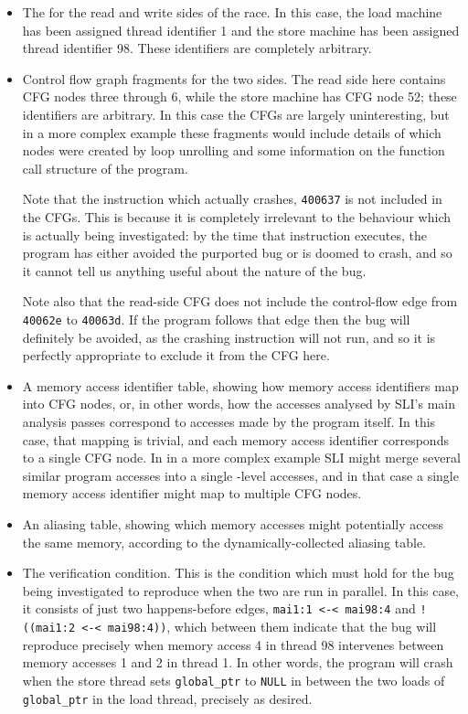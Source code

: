 \begin{itemize}
\item The {\StateMachines} for the read and write sides of the race.
  In this case, the load machine has been assigned thread identifier 1
  and the store machine has been assigned thread identifier 98.  These
  identifiers are completely arbitrary.
\item Control flow graph fragments for the two sides.  The read side
  here contains CFG nodes three through 6, while the store machine has
  CFG node 52; these identifiers are arbitrary.  In this case the CFGs
  are largely uninteresting, but in a more complex example these
  fragments would include details of which nodes were created by
  loop unrolling and some information on the function call structure
  of the program.

  Note that the instruction which actually crashes, \verb|400637| is
  not included in the CFGs.  This is because it is completely
  irrelevant to the behaviour which is actually being investigated: by
  the time that instruction executes, the program has either avoided
  the purported bug or is doomed to crash, and so it cannot tell us
  anything useful about the nature of the bug.

  Note also that the read-side CFG does not include the control-flow
  edge from \verb|40062e| to \verb|40063d|.  If the program follows
  that edge then the bug will definitely be avoided, as the crashing
  instruction will not run, and so it is perfectly appropriate to
  exclude it from the CFG here.
\item A memory access identifier table, showing how memory access
  identifiers map into CFG nodes, or, in other words, how the accesses
  analysed by SLI's main analysis passes correspond to accesses made
  by the program itself.  In this case, that mapping is trivial, and
  each memory access identifier corresponds to a single CFG node.  In
  in a more complex example SLI might merge several similar program
  accesses into a single \StateMachine-level accesses, and in that
  case a single memory access identifier might map to multiple CFG
  nodes.
\item An aliasing table, showing which memory accesses might
  potentially access the same memory, according to the
  dynamically-collected aliasing table.
\item The verification condition.  This is the condition which must
  hold for the bug being investigated to reproduce when the two
  \StateMachines are run in parallel.  In this case, it consists of
  just two happens-before edges, \verb|mai1:1 <-< mai98:4| and
  \verb|!((mai1:2 <-< mai98:4))|, which between them indicate that the
  bug will reproduce precisely when memory access 4 in thread 98
  intervenes between memory accesses 1 and 2 in thread 1.  In other
  words, the program will crash when the store thread sets
  \verb|global_ptr| to \verb|NULL| in between the two loads of
  \verb|global_ptr| in the load thread, precisely as desired.
\end{itemize}

